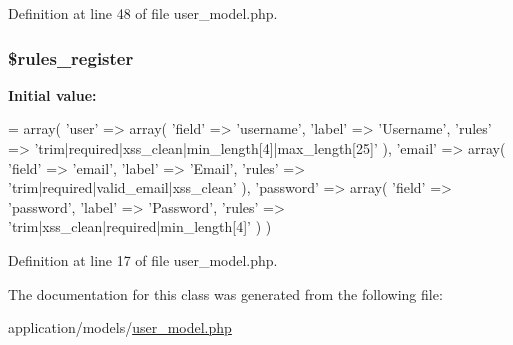 Definition at line 48 of file user\-\_\-model.\-php.

\hypertarget{class_user__model_a0f3f8ec0bddafbf99975029a3670d58b}{
\subsubsection[{\$rules\-\_\-register}]{\setlength{\rightskip}{0pt plus 5cm}\$rules\-\_\-register}}\label{class_user__model_a0f3f8ec0bddafbf99975029a3670d58b}
{\bfseries Initial value\-:}
\begin{DoxyCode}
= array(
        \textcolor{stringliteral}{'user'} => array(
            \textcolor{stringliteral}{'field'} => \textcolor{stringliteral}{'username'}, 
            \textcolor{stringliteral}{'label'} => \textcolor{stringliteral}{'Username'}, 
            \textcolor{stringliteral}{'rules'} => \textcolor{stringliteral}{'trim|required|xss\_clean|min\_length[4]|max\_length[25]'}
        ),
        \textcolor{stringliteral}{'email'} => array(
            \textcolor{stringliteral}{'field'} => \textcolor{stringliteral}{'email'}, 
            \textcolor{stringliteral}{'label'} => \textcolor{stringliteral}{'Email'}, 
            \textcolor{stringliteral}{'rules'} => \textcolor{stringliteral}{'trim|required|valid\_email|xss\_clean'}
        ),
        \textcolor{stringliteral}{'password'} => array(
            \textcolor{stringliteral}{'field'} => \textcolor{stringliteral}{'password'}, 
            \textcolor{stringliteral}{'label'} => \textcolor{stringliteral}{'Password'}, 
            \textcolor{stringliteral}{'rules'} => \textcolor{stringliteral}{'trim|xss\_clean|required|min\_length[4]'}
        )
    )
\end{DoxyCode}


Definition at line 17 of file user\-\_\-model.\-php.



The documentation for this class was generated from the following file\-:\begin{DoxyCompactItemize}
\item 
application/models/\hyperlink{user__model_8php}{user\-\_\-model.\-php}\end{DoxyCompactItemize}
